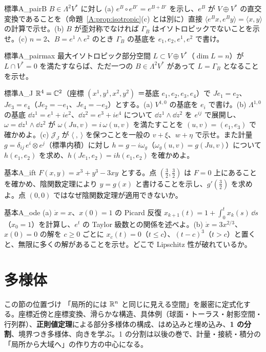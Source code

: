 \begin{probl}{標準}{A_pairB}
$B\in\Lambda^2V^*$ に対し (a) $e^B\circ e^{B'}=e^{B+B'}$ を示し、$e^B$ が $V\oplus V^*$ の直交変換であることを（命題~\ref{A:prop:isotropic}(c) とは別に）直接 $\langle e^Bx,e^By\rangle=\langle x,y\rangle$ の計算で示せ。(b) $B$ が歪対称でなければ $\Gamma_B$ はイソトロピックでないことを示せ。(c) $n=2$、$B=e^1\wedge e^2$ のとき $\Gamma_B$ の基底を $e_1,e_2,e^1,e^2$ で書け。
\end{probl}

\begin{probl}{標準}{A_pairmax}
最大イソトロピック部分空間 $L\subset V\oplus V^*$（$\dim L=n$）が $L\cap V^*=0$ を満たすならば、ただ一つの $B\in\Lambda^2V^*$ があって $L=\Gamma_B$ となることを示せ。
\end{probl}

\begin{probl}{標準}{A_J}
$\mathbb R^4=\mathbb C^2$（座標 $(x^1,y^1,x^2,y^2)$ ＝基底 $e_1,e_2,e_3,e_4$）で $Je_1=e_2$、$Je_3=e_4$（$Je_2=-e_1$、$Je_4=-e_3$）とする。(a) $V^{1,0}$ の基底を $e_i$ で書け。(b) $\Lambda^{1,0}$ の基底 $\dd z^1=e^1+ie^2$、$\dd z^2=e^3+ie^4$ について $\dd z^1\wedge\dd z^2$ を $e^{ij}$ で展開し、$\omega=\dd z^1\wedge\dd z^2$ が $\omega(Ju,v)=i\,\omega(u,v)$ を満たすことを $(u,v)=(e_1,e_3)$ で確かめよ。(c) $\mathcal J_J$ が $\langle\ ,\ \rangle$ を保つことを一般の $v+\xi$、$w+\eta$ で示せ。また計量 $g=\delta_{ij}\,e^i\otimes e^j$（標準内積）に対し $h=g-i\omega_g$（$\omega_g(u,v)=g(Ju,v)$）について $h(e_1,e_2)$ を求め、$h(Je_1,e_2)=ih(e_1,e_2)$ を確かめよ。
\end{probl}

\begin{probl}{基本}{A_ift}
$F(x,y)=x^3+y^3-3xy$ とする。点 $(\frac32,\frac32)$ は $F=0$ 上にあることを確かめ、陰関数定理により $y=g(x)$ と書けることを示し、$g'(\frac32)$ を求めよ。点 $(0,0)$ ではなぜ陰関数定理が適用できないか。
\end{probl}

\begin{probl}{基本}{A_ode}
(a) $\dot x=x$、$x(0)=1$ の Picard 反復 $x_{k+1}(t)=1+\int_0^tx_k(s)\,\dd s$（$x_0=1$）を計算し、$e^t$ の Taylor 級数との関係を述べよ。(b) $\dot x=3x^{2/3}$、$x(0)=0$ の解を $c\ge0$ ごとに $x_c(t)=0$（$t\le c$）、$(t-c)^3$（$t>c$）と置くと、無限に多くの解があることを示せ。どこで Lipschitz 性が破れているか。
\end{probl}


\section{多様体}\label{A:sec2}
\begin{goalbox}{この節の位置づけ}
「局所的には $\mathbb R^n$ と同じに見える空間」を厳密に定式化する。座標近傍と座標変換、滑らかな構造、具体例（球面・トーラス・射影空間・行列群）、\textbf{正則値定理}による部分多様体の構成、はめ込みと埋め込み、\textbf{1 の分割}、境界つき多様体、向きを学ぶ。1 の分割は以後の巻で、計量・接続・積分の「局所から大域へ」の作り方の中心になる。
\end{goalbox}


